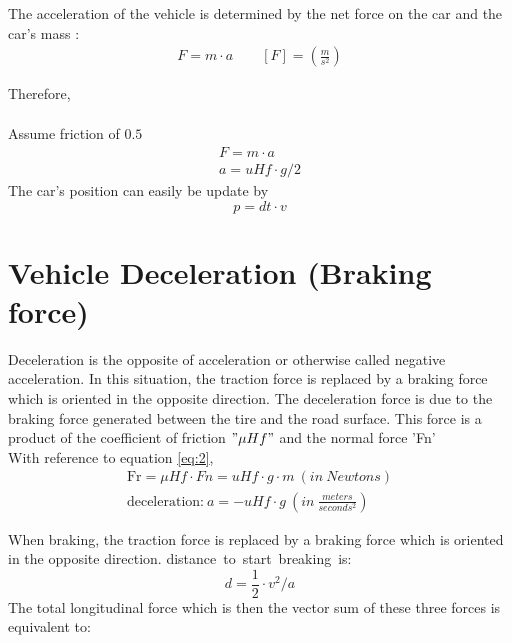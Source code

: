 \documentclass{book}
\begin{document}
The acceleration  of the vehicle is determined by the net force on the car and the car's mass :\\
\begin{eqnarray}
\textit{F} = \textit{m} \cdot \textit{a} \qquad [F] = (\frac{m}{ s^2})
\end{eqnarray}

Therefore,
\begin{eqnarray}
[Fr = \textit{uHf} \cdot \textit{g} \cdot \textit{m} / 2 ]
\end{eqnarray}

Assume friction of $ 0.5 $
\begin{eqnarray}
 F = m \cdot a \\ %
 a = uHf \cdot g / 2
\end{eqnarray}
The car's position can easily be update by
\begin{equation}
  p = dt \cdot v
\end{equation}



\section{Vehicle Deceleration (Braking force)}
Deceleration is the opposite of acceleration or otherwise called negative acceleration. In this situation, the traction force is replaced by a braking force which is oriented in the opposite direction. The deceleration force is due to the braking force generated between the tire and the road surface. This force is a product of the coefficient of friction $" \mu Hf"$ and the normal force 'Fn'\\
With reference to equation \ref{eq:2},
\begin{eqnarray}
\mbox{Fr}  = \mu Hf\cdot Fn = uHf\cdot g \cdot m \ (in \ Newtons) \\
\mbox{deceleration:} \  a = - uHf \cdot g  \  { \left( in \ \frac{meters}{ seconds^2}\right) }
\end{eqnarray}

When braking, the traction force is replaced by a braking force which is oriented in the opposite direction.
\mbox{distance to start breaking is:}
\begin{equation}
d = \frac{1}{2} \cdot  v^2/a
\end{equation}
The total longitudinal force which is then the vector sum of these three forces is equivalent to:
\begin{equation}
[F_{long} =   F_{braking} + F_{drag}   + F_{rr}]
\end{equation}
\end{document}
